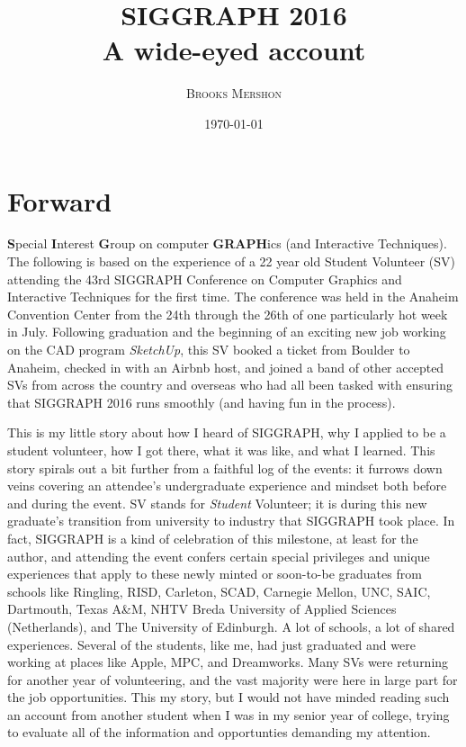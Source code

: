 \documentclass[a4paper, 11pt]{article} %
\title{\textbf{SIGGRAPH 2016}\\ %
A wide-eyed account} %
\author{\textsc{Brooks Mershon}} %
\date{\today} %
\begin{document}
\maketitle %

\eject


\renewcommand{\abstractname}{Forward} %

\section*{Forward}
	
\textbf{S}pecial \textbf{I}nterest \textbf{G}roup on computer \textbf{GRAPH}ics (and Interactive Techniques). The following is based on the experience of a 22 year old Student Volunteer (SV) attending the 43rd SIGGRAPH Conference on Computer Graphics and Interactive Techniques for the first time. The conference was held in the Anaheim Convention Center from the 24th through the 26th of one particularly hot week in July. Following graduation and the beginning of an exciting new job working on the CAD program \textit{SketchUp}, this SV booked a ticket from Boulder to Anaheim, checked in with an Airbnb host, and joined a band of other accepted SVs from across the country and overseas who had all been tasked with ensuring that SIGGRAPH 2016 runs smoothly (and having fun in the process).

This is my little story about how I heard of SIGGRAPH, why I applied to be a student volunteer, how I got there, what it was like, and what I learned. This story spirals out a bit further from a faithful log of the events: it furrows down veins covering an attendee's undergraduate experience and mindset both before and during the event. SV stands for \textit{Student} Volunteer; it is during this new graduate's transition from university to industry that SIGGRAPH took place. In fact, SIGGRAPH is a kind of celebration of this milestone, at least for the author, and attending the event confers certain special privileges and unique experiences that apply to these newly minted or soon-to-be graduates from schools like Ringling, RISD, Carleton, SCAD, Carnegie Mellon, UNC, SAIC, Dartmouth, Texas A\&M, NHTV Breda University of Applied Sciences (Netherlands), and The University of Edinburgh. A lot of schools, a lot of shared experiences. Several of the students, like me, had just graduated and were working at places like Apple, MPC, and Dreamworks. Many SVs were returning for another year of volunteering, and the vast majority were here in large part for the job opportunities. This my story, but I would not have minded reading such an account from another student when I was in my senior year of college, trying to evaluate all of the information and opportunties demanding my attention.
\end{document}
